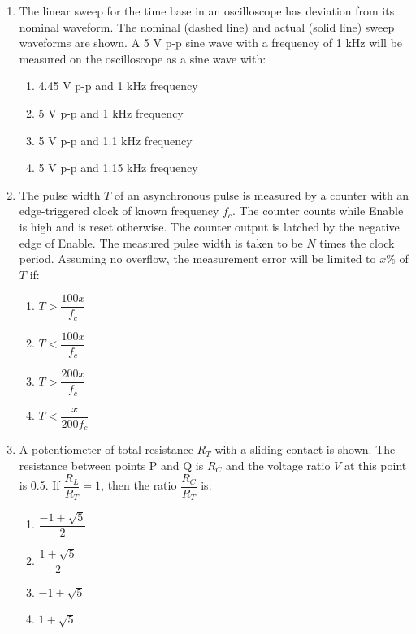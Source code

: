 \documentclass[journal]{IEEEtran}
\begin{document}
\begin{enumerate}
\item The linear sweep for the time base in an oscilloscope has deviation from its nominal waveform. The nominal (dashed line) and actual (solid line) sweep waveforms are shown. A 5 V p-p sine wave with a frequency of 1 kHz will be measured on the oscilloscope as a sine wave with:

\begin{multicols}{2}
\begin{enumerate}
    \item 4.45 V p-p and 1 kHz frequency
    \item 5 V p-p and 1 kHz frequency
    \item 5 V p-p and 1.1 kHz frequency
    \item 5 V p-p and 1.15 kHz frequency
\end{enumerate}
\end{multicols}

\item The pulse width $T$ of an asynchronous pulse is measured by a counter with an edge-triggered clock of known frequency $f_c$. The counter counts while Enable is high and is reset otherwise. The counter output is latched by the negative edge of Enable. The measured pulse width is taken to be $N$ times the clock period. Assuming no overflow, the measurement error will be limited to $x\%$ of $T$ if:

\begin{multicols}{2}
\begin{enumerate}
    \item $T > \dfrac{100x}{f_c}$
    \item $T < \dfrac{100x}{f_c}$
    \item $T > \dfrac{200x}{f_c}$
    \item $T < \dfrac{x}{200f_c}$
\end{enumerate}
\end{multicols}

\item A potentiometer of total resistance $R_T$ with a sliding contact is shown. The resistance between points P and Q is $R_C$ and the voltage ratio $V$ at this point is 0.5. If $\dfrac{R_L}{R_T} = 1$, then the ratio $\dfrac{R_C}{R_T}$ is:

\begin{multicols}{2}
\begin{enumerate}
    \item $\dfrac{-1 + \sqrt{5}}{2}$
    \item $\dfrac{1 + \sqrt{5}}{2}$
    \item $-1 + \sqrt{5}$
    \item $1 + \sqrt{5}$
\end{enumerate}
\end{multicols}


\end{enumerate}
\end{document}
